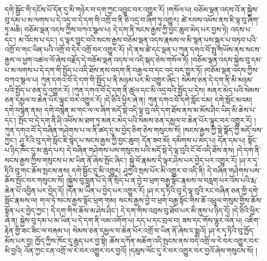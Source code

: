 དགེ་སྦྱོང་གི་དངོས་པོ་དོན་དུ་མི་གཉེར་བ་དག་ཀྱང་འབྱུང་བར་འགྱུར་རོ། །གསོལ་པ། བཅོམ་ལྡན་འདས་འོ་ན་སྐྱེས་བུ་དམ་པ་མ་ལགས་པ་དེ་འདྲ་བ་དེ་དག་གི་འགྲོ་བ་ནི་ཅི་འདྲ་བ་ཞིག་ཏུ་འགྱུར། ཚེ་རབས་འཕོས་ནས་ཇི་ལྟ་བུ་ཞིག་ཏུ་མཆི། བཅོམ་ལྡན་འདས་ཀྱིས་བཀའ་སྩལ་པ། དེ་དག་ནི་སངས་རྒྱས་ཀྱི་བྱང་ཆུབ་མེད་པར་བྱས་ཏེ། འདས་པ་དང་། མ་འོངས་པ་དང་། ད་ལྟར་བྱུང་བའི་སངས་རྒྱས་བཅོམ་ལྡན་འདས་རྣམས་ལ་མི་སྙན་པས་སྐུར་པ་བཏབ་པའི་འགྲོ་བ་གང་ཡིན་པའི་འགྲོ་བ་དེར་འགྲོ་བར་འགྱུར་རོ། །དེ་ནས་ཚེ་དང་ལྡན་པ་ཀུན་དགའ་བོ་སྤུ་གཡོས་ནས་སངས་རྒྱས་ལ་ཕྱག་འཚལ་ལོ་ཞེས་བརྗོད་དེ་བཅོམ་ལྡན་འདས་ལ་འདི་སྐད་ཅེས་གསོལ་ཏོ། །བཅོམ་ལྡན་འདས་སྐྱེས་བུ་དམ་པ་མ་ལགས་པ་དེ་དག་གི་སྤྱོད་པ་འདི་ཐོས་ནས་བདག་ནི་བརྒྱལ་བ་དང་འདྲ་བར་གྱུར་ཏོ། །བཅོམ་ལྡན་འདས་ཀྱིས་བཀའ་སྩལ་པ། ཀུན་དགའ་བོ་དེ་དག་གི་སྤྱོད་པ་ནི་མཉམ་པར་མི་འགྱུར་ཞིང་། སེམས་ཅན་དེ་དག་ནི་མི་མཉམ་པའི་སྤྱོད་པ་ཅན་དུ་འགྱུར་རོ། །ཀུན་དགའ་བོ་དེ་དག་ནི་ཚུལ་དང་མི་འདྲ་བའི་སྤྱོད་པ་དེས། མནར་མེད་པའི་སེམས་ཅན་དམྱལ་བ་ཆེན་པོར་ལྟུང་བར་འགྱུར་རོ། །དེ་ཅིའི་ཕྱིར་ཞེ་ན། ཀུན་དགའ་བོ་དགེ་སློང་ངམ། དགེ་སློང་མའམ། དགེ་བསྙེན་ནམ། དགེ་བསྙེན་མ་གང་ལ་ལ་ཞིག་མདོ་སྡེ་འདི་ལྟ་བུ་འདི་དག་ཐོས་ནས་མ་མོས་ཤིང་ཡིད་མི་ཆེས་པ་དང་། སྤོང་བ་དེ་དག་ནི་ཤི་འཕོས་མ་ཐག་ཏུ་མནར་མེད་པའི་སེམས་ཅན་དམྱལ་བ་ཆེན་པོར་ལྟུང་བར་འགྱུར་རོ། །ཀུན་དགའ་བོ་དེ་བཞིན་གཤེགས་པ་ལ་ནི་ཚད་དུ་མ་བྱེད་ཅིག་ཅེས་གསུངས་སོ། །སངས་རྒྱས་ཀྱི་སྡེ་སྣོད་ཀྱི་མདོ་ལས་ཀྱང་། ཤཱ་རིའི་བུ་དགེ་སློང་ཇི་སྙེད་པ་སངས་རྒྱས་ཀྱི་བྱང་ཆུབ། དོན་ཟབ་མོ། དམིགས་པ་མེད་པ། དོན་དམ་པ། སྟོང་པ་ཉིད་ཁོང་དུ་མ་ཆུད་པར། དེ་བཞིན་གཤེགས་པས་གསུངས་པའི་མདོ་སྡེ་དེ་ལྟ་བུའི་ངོ་བོ་འདི་ཐོས་ནས། །དེ་དག་ནི་སངས་རྒྱས་ཀྱིས་གསུངས་པ་མ་ཡིན་ནོ་ཞེས་སྤོང་ཞིང་། སྐྱེ་བོ་རྣམས་དེ་ལྟར་ཤེས་པར་བྱེད་པར་འགྱུར་རོ། །ཤ་ར་དྭ་ཏིའི་བུ་གང་ཆོས་སྤངས་ནས། དགེ་སྦྱོང་དུ་མི་འགྱུར། ཤཱཀྱའི་སྲས་པོར་མི་འགྱུར་བ་འདི་ནི། དེ་བཞིན་གཤེགས་པས་ཆོས་སྤོང་བར་གསུངས་སོ། །སྐྱེས་བུ་བླུན་པོ་དེ་ནི་སྲིད་པ་ན་བྱེ་བ་ཕྲག་བརྒྱ་སྟོང་རྣམས་ལ་བརླག་པར་འོས་པའི་རྨ་ཆེན་པོ་འབྱིན་པར་བྱེད་དོ། །དོན་མ་ཡིན་པ་བྱེད་པར་འགྱུར་རོ། །ཤ་ར་དྭ་ཏིའི་བུ་དེ་ལྟ་བུའི་རང་བཞིན་ཅན་གྱི་དགེ་སློང་རྣམས་ལ། གལ་ཏེ་སངས་རྒྱས་སྟོང་ཕྲག་གམ། སངས་རྒྱས་བྱེ་བ་ཕྲག་བརྒྱ་སྟོང་གིས་ཆོ་འཕྲུལ་གསུམ་གྱིས་ཆོས་སྟོན་པར་བྱེད་ཀྱང་། དེ་དག་གིས་ཆོས་མ་ཤེས་ཤིང་། དེ་དག་གིས་འབྲས་བུ་ཐོབ་པར་མི་ནུས་པ་ཉིད་དོ། །དེ་ཅིའི་ཕྱིར་ཞེ་ན། སྐྱེས་བུ་དམ་པ་མ་ཡིན་པ་དེ་དག་ནི་ལམ་འགོག་པ། དད་པ་དང་བྲལ་བ། ཟས་དང་གོས་ལྷུར་ལེན་པ། འཇིག་རྟེན་གྱི་ཟང་ཟིང་ལ་བརྐམ་པ། སེམས་ཅན་དམྱལ་བ་ཆེན་པོར་འགྲོ་བ་ཡིན་ནོ་ཞེས་ང་སྨྲའོ། །ཤ་ར་དྭ་ཏིའི་བུ་ཁྱོད་མོས་པར་བྱ། ཁྱོད་ཀྱིས་ཁོང་དུ་ཆུད་པར་བྱ་སྟེ། ཆོས་དཀོན་མཆོག་འདི་སྤངས་ནས་བདེ་འགྲོ་ལ་རེ་བར་འགྱུར་བར་མི་བྱའི། འོན་ཀྱང་ངན་འགྲོ་ལ་རེ་བར་འགྱུར་བར་བྱའོ། །དམུས་ལོང་དུ་རེ་བར་འགྱུར་བར་བྱའོ་ཞེས་གསུངས་སོ། །
